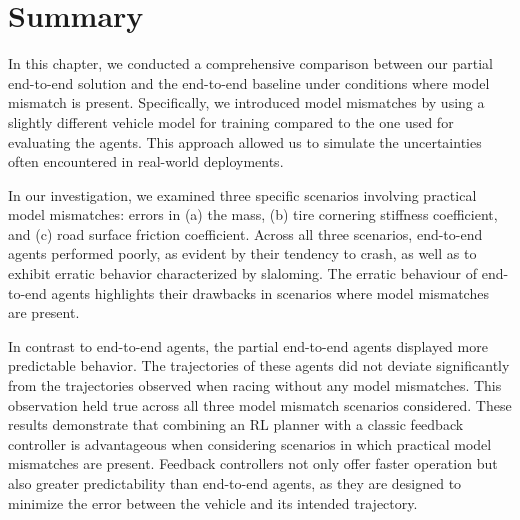 \section{Summary}

In this chapter, we conducted a comprehensive comparison between our partial end-to-end solution and the end-to-end baseline under conditions where model mismatch is present. 
Specifically, we introduced model mismatches by using a slightly different vehicle model for training compared to the one used for evaluating the agents. 
This approach allowed us to simulate the uncertainties often encountered in real-world deployments.


In our investigation, we examined three specific scenarios involving practical model mismatches: errors in (a) the mass, (b) tire cornering stiffness coefficient, and (c) road surface friction coefficient. 
Across all three scenarios, end-to-end agents performed poorly, as evident by their tendency to crash, as well as to exhibit erratic behavior characterized by slaloming.
The erratic behaviour of end-to-end agents highlights their drawbacks in scenarios where model mismatches are present.


In contrast to end-to-end agents, the partial end-to-end agents displayed more predictable behavior.
The trajectories of these agents did not deviate significantly from the trajectories observed when racing without any model mismatches.
This observation held true across all three model mismatch scenarios considered.
These results demonstrate that combining an RL planner with a classic feedback controller is advantageous when considering scenarios in which practical model mismatches are present.
Feedback controllers not only offer faster operation but also greater predictability than end-to-end agents, as they are designed to minimize the error between the vehicle and its intended trajectory.